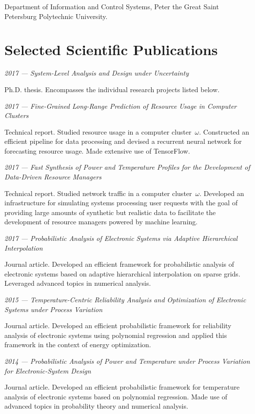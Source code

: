 \documentclass[journal]{IEEEtran}
\begin{document}
Department of Information and Control Systems, Peter the Great Saint Petersburg
Polytechnic University.

\section{Selected Scientific Publications}
\emph{2017 --- System-Level Analysis and Design under Uncertainty}
\cite{ukhov2017d}

Ph.D. thesis. Encompasses the individual research projects listed below.

\emph{2017 --- Fine-Grained Long-Range Prediction of Resource Usage in Computer
Clusters} \cite{ukhov2017b}

Technical report. Studied resource usage in a computer cluster~$\omega$.
Constructed an efficient pipeline for data processing and devised a recurrent
neural network for forecasting resource usage. Made extensive use of TensorFlow.

\emph{2017 --- Fast Synthesis of Power and Temperature Profiles for the
Development of Data-Driven Resource Managers} \cite{ukhov2017c}

Technical report. Studied network traffic in a computer cluster~$\omega$.
Developed an infrastructure for simulating systems processing user requests with
the goal of providing large amounts of synthetic but realistic data to
facilitate the development of resource managers powered by machine learning.

\emph{2017 --- Probabilistic Analysis of Electronic Systems via Adaptive
Hierarchical Interpolation} \cite{ukhov2017a}

Journal article. Developed an efficient framework for probabilistic analysis of
electronic systems based on adaptive hierarchical interpolation on sparse grids.
Leveraged advanced topics in numerical analysis.

\emph{2015 --- Temperature-Centric Reliability Analysis and Optimization of
Electronic Systems under Process Variation} \cite{ukhov2015}

Journal article. Developed an efficient probabilistic framework for reliability
analysis of electronic systems using polynomial regression and applied this
framework in the context of energy optimization.

\emph{2014 --- Probabilistic Analysis of Power and Temperature under Process
Variation for Electronic-System Design} \cite{ukhov2014b}

Journal article. Developed an efficient probabilistic framework for temperature
analysis of electronic systems based on polynomial regression. Made use of
advanced topics in probability theory and numerical analysis.
\end{document}
